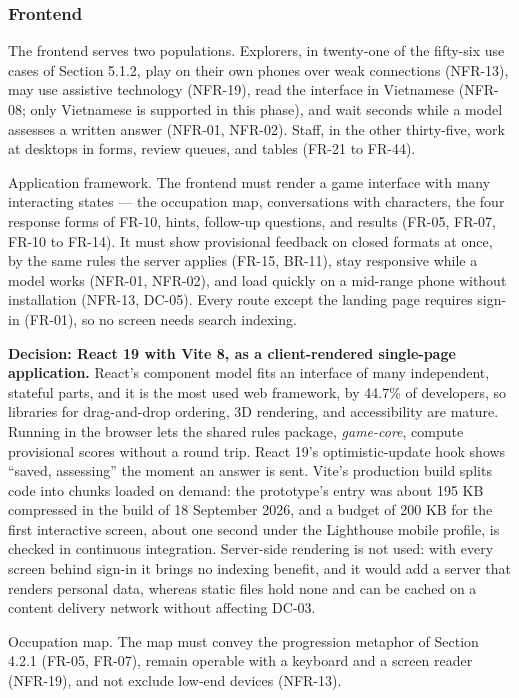 \subsubsection{Frontend}

The frontend serves two populations. Explorers, in twenty-one of the fifty-six use cases of Section 5.1.2, play on their own phones over weak connections (NFR-13), may use assistive technology (NFR-19), read the interface in Vietnamese (NFR-08; only Vietnamese is supported in this phase), and wait seconds while a model assesses a written answer (NFR-01, NFR-02). Staff, in the other thirty-five, work at desktops in forms, review queues, and tables (FR-21 to FR-44).

Application framework. The frontend must render a game interface with many interacting states --- the occupation map, conversations with characters, the four response forms of FR-10, hints, follow-up questions, and results (FR-05, FR-07, FR-10 to FR-14). It must show provisional feedback on closed formats at once, by the same rules the server applies (FR-15, BR-11), stay responsive while a model works (NFR-01, NFR-02), and load quickly on a mid-range phone without installation (NFR-13, DC-05). Every route except the landing page requires sign-in (FR-01), so no screen needs search indexing.

\textbf{Decision: React 19 with Vite 8, as a client-rendered single-page application.} React's component model fits an interface of many independent, stateful parts, and it is the most used web framework, by 44.7\% of developers\cite{r136}, so libraries for drag-and-drop ordering, 3D rendering, and accessibility are mature. Running in the browser lets the shared rules package, \textit{game-core}, compute provisional scores without a round trip. React 19's optimistic-update hook shows ``saved, assessing'' the moment an answer is sent\cite{r137}. Vite's production build splits code into chunks loaded on demand\cite{r138}: the prototype's entry was about 195 KB compressed in the build of 18 September 2026, and a budget of 200 KB for the first interactive screen, about one second under the Lighthouse mobile profile\cite{r139}, is checked in continuous integration. Server-side rendering is not used: with every screen behind sign-in it brings no indexing benefit, and it would add a server that renders personal data, whereas static files hold none and can be cached on a content delivery network without affecting DC-03.

Occupation map. The map must convey the progression metaphor of Section 4.2.1 (FR-05, FR-07), remain operable with a keyboard and a screen reader (NFR-19), and not exclude low-end devices (NFR-13).

